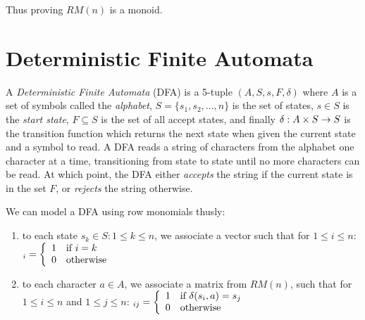 Thus proving $RM(n)$ is a monoid.

\section{Deterministic Finite Automata}

A \emph{Deterministic Finite Automata} (DFA) is a 5-tuple
$(A,S,s,F,\delta)$ where $A$ is a set of symbols called the
\emph{alphabet}, $S = \{ s_1, s_2, ..., n \} $ is the set of states,
$s \in S$ is the \emph{start state}, $F \subseteq S$ is the set of all
accept states, and finally $\delta: A \times S \rightarrow S$ is the
transition function which returns the next state when given the
current state and a symbol to read.  A DFA reads a string of
characters from the alphabet one character at a time, transitioning
from state to state until no more characters can be read.  At which
point, the DFA either \emph{accepts} the string if the current state
is in the set $F$, or \emph{rejects} the string otherwise.

We can model a DFA using row monomials thusly:

\begin{enumerate}
\item to each state $s_k \in S : 1 \leq k \leq n$, we associate a vector
  such that for $1 \leq i \leq n$:
  \begin{math}
    [s]_i = \left\{
      \begin{array}{l l}
        1 & \text{if } i = k \\
        0 & \text{otherwise}
      \end{array} \right.
  \end{math}

\item to each character $a \in A$, we associate a matrix from $RM(n)$,
  such that for $1 \leq i \leq n$ and $1 \leq j \leq n$:
  \begin{math}
    [a]_{ij} = \left\{
      \begin{array}{l l}
        1 & \text{if } \delta(s_i,a) = s_j \\
        0 & \text{otherwise}
      \end{array} \right.
  \end{math}
\end{enumerate}
